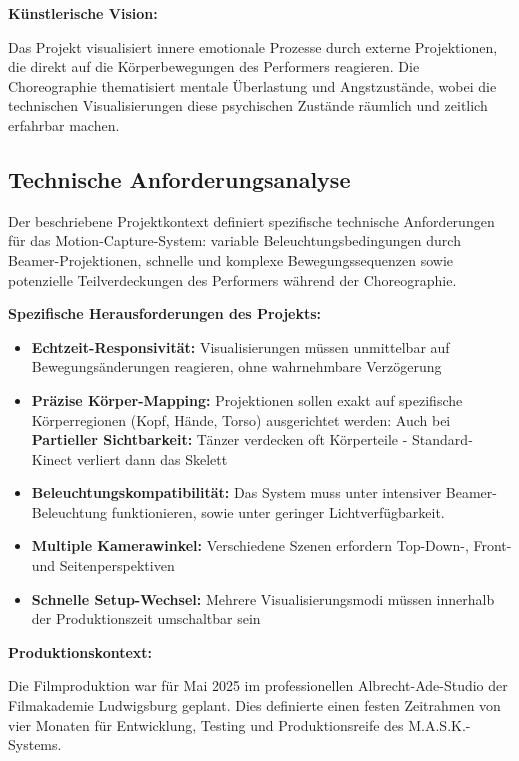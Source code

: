 \newpage

\textbf{Künstlerische Vision:}

Das Projekt visualisiert innere emotionale Prozesse durch externe Projektionen, die direkt auf die Körperbewegungen des Performers reagieren. Die Choreographie thematisiert mentale Überlastung und Angstzustände, wobei die technischen Visualisierungen diese psychischen Zustände räumlich und zeitlich erfahrbar machen.

\subsection{Technische Anforderungsanalyse}

Der beschriebene Projektkontext definiert spezifische technische Anforderungen für das Motion-Capture-System: variable Beleuchtungsbedingungen durch Beamer-Projektionen, schnelle und komplexe Bewegungssequenzen sowie potenzielle Teilverdeckungen des Performers während der Choreographie. 

\textbf{Spezifische Herausforderungen des Projekts:}

\begin{itemize}
    \item \textbf{Echtzeit-Responsivität:} Visualisierungen müssen unmittelbar auf Bewegungsänderungen reagieren, ohne wahrnehmbare Verzögerung
    \item \textbf{Präzise Körper-Mapping:} Projektionen sollen exakt auf spezifische Körperregionen (Kopf, Hände, Torso) ausgerichtet werden: Auch bei \textbf{Partieller Sichtbarkeit:} Tänzer verdecken oft Körperteile - Standard-Kinect verliert dann das Skelett
    \item \textbf{Beleuchtungskompatibilität:} Das System muss unter intensiver Beamer-Beleuchtung funktionieren, sowie unter geringer Lichtverfügbarkeit.
    \item \textbf{Multiple Kamerawinkel:} Verschiedene Szenen erfordern Top-Down-, Front- und Seitenperspektiven
    \item \textbf{Schnelle Setup-Wechsel:} Mehrere Visualisierungsmodi müssen innerhalb der Produktionszeit umschaltbar sein
\end{itemize}

\textbf{Produktionskontext:}

Die Filmproduktion war für Mai 2025 im professionellen Albrecht-Ade-Studio der Filmakademie Ludwigsburg geplant. Dies definierte einen festen Zeitrahmen von vier Monaten für Entwicklung, Testing und Produktionsreife des M.A.S.K.-Systems.


